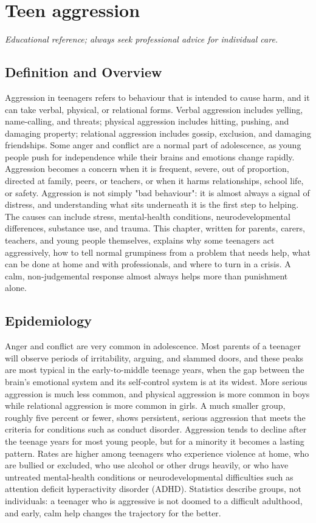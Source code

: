 \chapter{Teen aggression}

\medskip
\noindent\textit{Educational reference; always seek professional advice for individual care.}

\section*{Definition and Overview}
Aggression in teenagers refers to behaviour that is intended to cause harm, and it can take verbal, physical, or relational forms. Verbal aggression includes yelling, name-calling, and threats; physical aggression includes hitting, pushing, and damaging property; relational aggression includes gossip, exclusion, and damaging friendships. Some anger and conflict are a normal part of adolescence, as young people push for independence while their brains and emotions change rapidly. Aggression becomes a concern when it is frequent, severe, out of proportion, directed at family, peers, or teachers, or when it harms relationships, school life, or safety. Aggression is not simply "bad behaviour": it is almost always a signal of distress, and understanding what sits underneath it is the first step to helping. The causes can include stress, mental-health conditions, neurodevelopmental differences, substance use, and trauma. This chapter, written for parents, carers, teachers, and young people themselves, explains why some teenagers act aggressively, how to tell normal grumpiness from a problem that needs help, what can be done at home and with professionals, and where to turn in a crisis. A calm, non-judgemental response almost always helps more than punishment alone.

\section*{Epidemiology}
Anger and conflict are very common in adolescence. Most parents of a teenager will observe periods of irritability, arguing, and slammed doors, and these peaks are most typical in the early-to-middle teenage years, when the gap between the brain's emotional system and its self-control system is at its widest. More serious aggression is much less common, and physical aggression is more common in boys while relational aggression is more common in girls. A much smaller group, roughly five percent or fewer, shows persistent, serious aggression that meets the criteria for conditions such as conduct disorder. Aggression tends to decline after the teenage years for most young people, but for a minority it becomes a lasting pattern. Rates are higher among teenagers who experience violence at home, who are bullied or excluded, who use alcohol or other drugs heavily, or who have untreated mental-health conditions or neurodevelopmental difficulties such as attention deficit hyperactivity disorder (ADHD). Statistics describe groups, not individuals: a teenager who is aggressive is not doomed to a difficult adulthood, and early, calm help changes the trajectory for the better.

